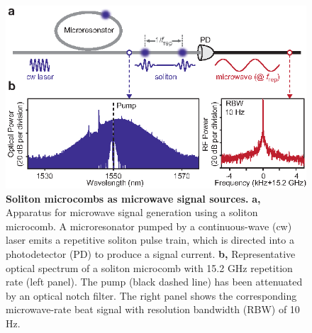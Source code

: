\documentclass[noshowpacs,amsmath,
twocolumn,
superscriptaddress,
8pt,
aps,prb]{revtex4-2}
\begin{document}
\begin{figure}[b]
\includegraphics[width=\linewidth]{Fig1.eps}
\caption{{\bf Soliton microcombs as microwave signal sources.} {\bf a,} Apparatus for microwave signal generation using a soliton microcomb. A microresonator pumped by a continuous-wave (cw) laser emits a repetitive soliton pulse train, which is directed into a photodetector (PD) to produce a signal current. {\bf b,} Representative optical spectrum of a soliton microcomb with 15.2 GHz repetition rate (left panel). The pump (black dashed line) has been attenuated by an optical notch filter. The right panel shows the corresponding microwave-rate beat signal with resolution bandwidth (RBW) of 10 Hz.}
\label{figure1}
\end{figure}
\end{document}
